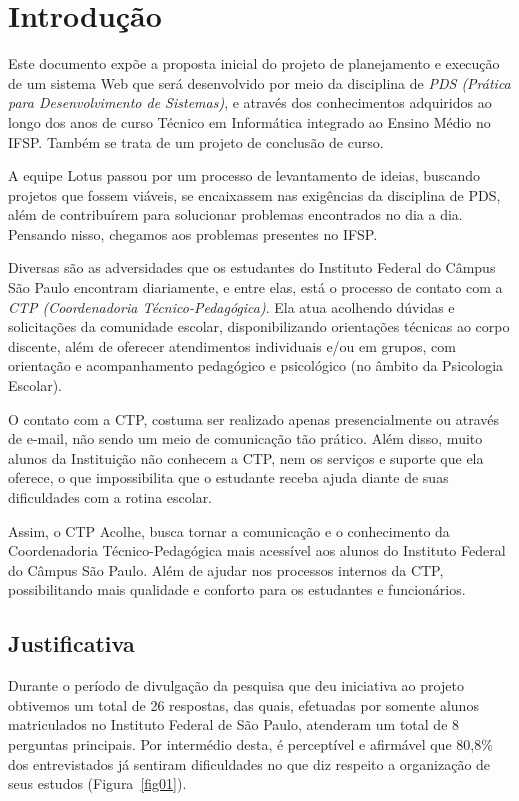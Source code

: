 \documentclass[12pt,a4paper]{article}
\begin{document}
\newpage

\section{Introdução}
\pagestyle{plain}

Este documento expõe a proposta inicial do projeto de planejamento e execução de um sistema Web que será desenvolvido por meio da disciplina de \textit{PDS (Prática para Desenvolvimento de Sistemas)}, e através dos conhecimentos adquiridos ao longo dos anos de curso Técnico em Informática integrado ao Ensino Médio no IFSP. Também se trata de um projeto de conclusão de curso.
\indent

A equipe Lotus passou por um processo de levantamento de ideias, buscando projetos que fossem viáveis, se encaixassem nas exigências da disciplina de PDS, além de contribuírem para solucionar problemas encontrados no dia a dia. Pensando nisso, chegamos aos problemas presentes no IFSP.
\indent

Diversas são as adversidades que os estudantes do Instituto Federal do Câmpus São Paulo encontram diariamente, e entre elas, está o processo de contato com a \textit{CTP (Coordenadoria Técnico-Pedagógica)}. Ela atua acolhendo dúvidas e solicitações da comunidade escolar, disponibilizando orientações técnicas ao corpo discente, além de oferecer atendimentos individuais e/ou em grupos, com orientação e acompanhamento pedagógico e psicológico (no âmbito da Psicologia Escolar). 
\indent

O contato com a CTP, costuma ser realizado apenas presencialmente ou através de e-mail, não sendo um meio de comunicação tão prático. Além disso, muito alunos da Instituição não conhecem a CTP, nem os serviços e suporte que ela oferece, o que impossibilita que o estudante receba ajuda diante de suas dificuldades com a rotina escolar. 

\indent
Assim, o CTP Acolhe, busca tornar a comunicação e o conhecimento da Coordenadoria Técnico-Pedagógica mais acessível aos alunos do Instituto Federal do Câmpus São Paulo. Além de ajudar nos processos internos da CTP, possibilitando mais qualidade e conforto para os estudantes e funcionários.  

\subsection{Justificativa}

Durante o período de divulgação da pesquisa que deu iniciativa ao projeto obtivemos um total de 26 respostas, das quais, efetuadas por somente alunos matriculados no Instituto Federal de São Paulo, atenderam um total de 8 perguntas principais. Por intermédio desta, é perceptível e afirmável que 80,8\% dos entrevistados já sentiram dificuldades no que diz respeito a organização de seus estudos (Figura~\ref{fig01}).
\end{document}
